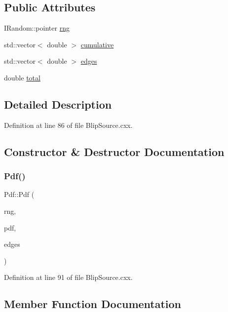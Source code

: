 \subsection*{Public Attributes}
\begin{DoxyCompactItemize}
\item 
I\+Random\+::pointer \hyperlink{struct_pdf_a7e63961db385abed7be8af1d991a001c}{rng}
\item 
std\+::vector$<$ double $>$ \hyperlink{struct_pdf_a8a2c4cffa10d152bf88741f1b60cbfb2}{cumulative}
\item 
std\+::vector$<$ double $>$ \hyperlink{struct_pdf_a57275ab1190b2639e67f539c888412e5}{edges}
\item 
double \hyperlink{struct_pdf_a148e102a802403c9adad6855a79c62b7}{total}
\end{DoxyCompactItemize}


\subsection{Detailed Description}


Definition at line 86 of file Blip\+Source.\+cxx.



\subsection{Constructor \& Destructor Documentation}
\mbox{\label{struct_pdf_a96006e28fb296b3d175fb4cf3cd8f50a}} 
\subsubsection{\texorpdfstring{Pdf()}{Pdf()}}
{\footnotesize\ttfamily Pdf\+::\+Pdf (\begin{DoxyParamCaption}\item[{I\+Random\+::pointer}]{rng,  }\item[{const std\+::vector$<$ double $>$ \&}]{pdf,  }\item[{const std\+::vector$<$ double $>$ \&}]{edges }\end{DoxyParamCaption})\hspace{0.3cm}{\ttfamily [inline]}}



Definition at line 91 of file Blip\+Source.\+cxx.



\subsection{Member Function Documentation}
\mbox{\label{struct_pdf_a03ace21f984d07fe2823c57a2f59c3fe}} 
